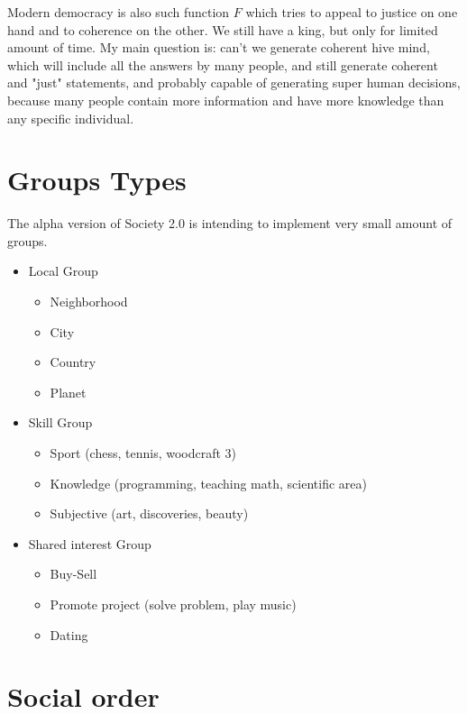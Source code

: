 \documentclass{article}
\begin{document}
Modern democracy is also such function $F$ which tries to appeal to justice on one hand and to coherence on the other. We still have a king, but only for limited amount of time. My main question is: can't we generate coherent hive mind, which will include all the answers by many people, and still generate coherent and "just" statements, and probably capable of generating super human decisions, because many people contain more information and have more knowledge than any specific individual. 
\\
\section{Groups Types}

The alpha version of Society 2.0 is intending to implement very small amount of groups. 

\renewcommand{\labelitemii}{$\star$}

\begin{itemize}
	\item Local Group
\begin{itemize} 
	\item Neighborhood
	\item City
	\item Country
	\item Planet
\end{itemize}
	\item Skill Group 
\begin{itemize} 
	\item Sport (chess, tennis, woodcraft 3)
	\item Knowledge (programming, teaching math, scientific area)
	\item Subjective (art, discoveries, beauty)
\end{itemize}
	\item Shared interest Group
\begin{itemize} 
	\item Buy-Sell
	\item Promote project (solve problem, play music)
	\item Dating
\end{itemize}
	
\end{itemize}

\section{Social order}
\end{document}
